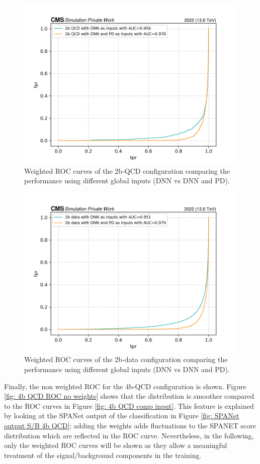 \begin{figure}[hbt]
    \centering
    \includegraphics[width=0.7\linewidth]{Images/7.S:B/Inputs/2b QCD.png}
    \caption{Weighted ROC curves of the 2b-QCD configuration comparing the performance using different global inputs (DNN vs DNN and PD).}
    \label{fig: 2b QCD comp input}
\end{figure}

\begin{figure}[hbt]
    \centering
    \includegraphics[width=0.7\linewidth]{Images/7.S:B/Inputs/2b data.png}
    \caption{Weighted ROC curves of the 2b-data configuration comparing the performance using different global inputs (DNN vs DNN and PD).}
    \label{fig: 2b data comp input}
\end{figure}

Finally, the non weighted ROC for the 4b-QCD configuration is shown. Figure \ref{fig: 4b QCD ROC no weights} shows that the distribution is smoother compared to the ROC curves in Figure \ref{fig: 4b QCD comp input}. This feature is explained by looking at the SPANet output of the classification in Figure \ref{fig: SPANet output S/B 4b QCD}: adding the weights adds fluctuations to the SPANET score distribution which are reflected in the ROC curve. Nevertheless, in the following, only the weighted ROC curves will be shown as they allow a meaningful treatment of the signal/background components in the training.

